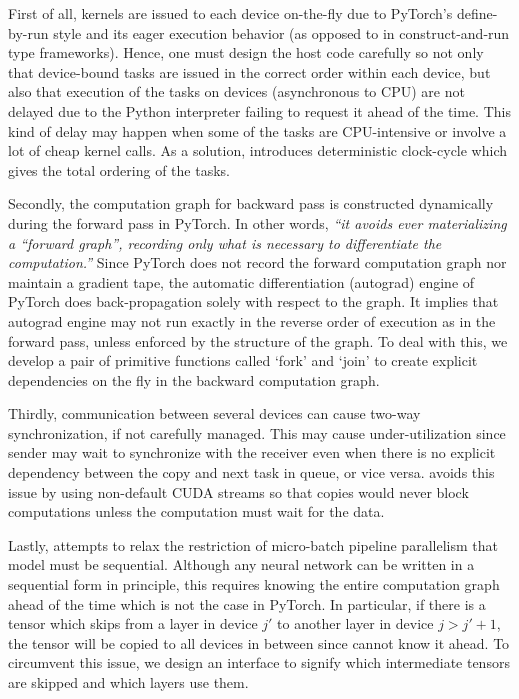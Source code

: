 First of all, kernels are issued to each device on-the-fly due to PyTorch's define-by-run style and its eager execution behavior (as opposed to in construct-and-run type frameworks). Hence, one must design the host code carefully so not only that device-bound tasks are issued in the correct order within each device, but also that execution of the tasks on devices (asynchronous to CPU) are not delayed due to the Python interpreter failing to request it ahead of the time. This kind of delay may happen when some of the tasks are CPU-intensive or involve a lot of cheap kernel calls. As a solution, {\torchgpipe} introduces deterministic clock-cycle which gives the total ordering of the tasks.

Secondly, the computation graph for backward pass is constructed dynamically during the forward pass in PyTorch. In other words, \emph{``it avoids ever materializing a ``forward graph'', recording only what is necessary to differentiate the computation.''} \cite{paszke2017automatic} Since PyTorch does not record the forward computation graph nor maintain a gradient tape, the automatic differentiation (autograd) engine of PyTorch does back-propagation solely with respect to the graph. It implies that autograd engine may not run exactly in the reverse order of execution as in the forward pass, unless enforced by the structure of the graph. To deal with this, we develop a pair of primitive functions called `fork' and `join' to create explicit dependencies on the fly in the backward computation graph.

Thirdly, communication between several devices can cause two-way synchronization, if not carefully managed. This may cause under-utilization since sender may wait to synchronize with the receiver even when there is no explicit dependency between the copy and next task in queue, or vice versa. {\torchgpipe} avoids this issue by using non-default CUDA streams so that copies would never block computations unless the computation must wait for the data.


Lastly, {\torchgpipe} attempts to relax the restriction of micro-batch pipeline parallelism that model must be sequential. Although any neural network can be written in a sequential form in principle, this requires knowing the entire computation graph ahead of the time which is not the case in PyTorch. In particular, if there is a tensor which skips from a layer in device $j'$ to another layer in device $j > j'+1$, the tensor will be copied to all devices in between since {\torchgpipe} cannot know it ahead.
To circumvent this issue, we design an interface to signify which intermediate tensors are skipped and which layers use them.


